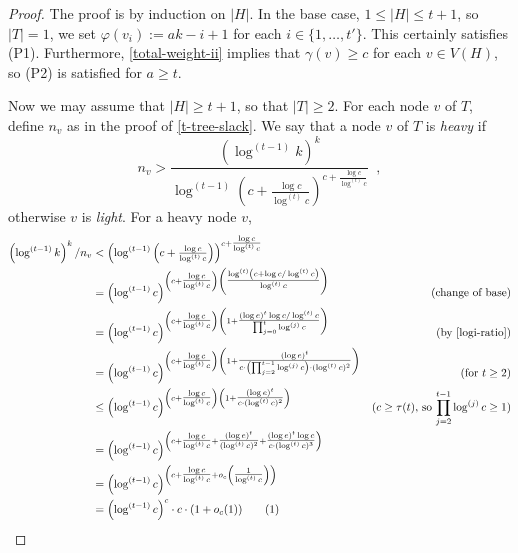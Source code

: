 \documentclass[kpfonts]{patmorin}
\newcommand\numberthis{\addtocounter{equation}{1}\tag{\theequation}}
\theoremstyle{named}
\begin{document}
\begin{proof}
    The proof is by induction on $|H|$. In the base case, $1\le|H|\le t+1$, so $|T|=1$, we set $\varphi(v_i):=ak-i+1$ for each $i\in\{1,\ldots,t'\}$.  This certainly satisfies (P1).  Furthermore, \cref{total-weight-ii} implies that $\gamma(v)\ge c$ for each $v\in V(H)$, so (P2) is satisfied for $a\ge t$.

    Now we may assume that $|H|\ge t+1$, so that $|T|\ge 2$.  For each node $v$ of $T$, define $n_v$ as in the proof of \cref{t-tree-slack}.   We say that a node $v$ of $T$ is \emph{heavy} if
    \[
        n_v> \frac{\left(\log^{(t-1)} k\right)^k}{\log^{(t-1)}\left(c+\tfrac{\log c}{\log^{(t)} c}\right)^{c+\tfrac{\log c}{\log^{(t)} c}}} \enspace ,
    \]
    otherwise $v$ is \emph{light}.  For a heavy node $v$,
    \begin{align*}
        \left(\log^{(t-1)} k\right)^k/n_v
        & < \left(\log^{(t-1)}\left(c+\tfrac{\log c}{\log^{(t)} c}\right)\right)^{c+\tfrac{\log c}{\log^{(t)} c}} \\
        & = \left(\log^{(t-1)}c\right)^{\left(c+\tfrac{\log c}{\log^{(t)} c}\right)
        \left(\tfrac{\log^{(t)}\left(c+\log c/\log^{(t)} c\right)}{\log^{(t)} c}\right)} &\text{(change of base)} \\
        & = \left(\log^{(t-1)}c\right)^{\left(c+\tfrac{\log c}{\log^{(t)} c}\right)
        \left(
        1 + \tfrac{(\log e)^t\log c/\log^{(t)} c}{\prod_{j=0}^{t}\log^{(j)}c}
        \right)} & \text{(by \cref{logi-ratio})} \\
        & = \left(\log^{(t-1)}c\right)^{\left(c+\tfrac{\log c}{\log^{(t)} c}\right)
        \left(
        1 + \tfrac{(\log e)^t}{c\cdot\left(\prod_{j=2}^{t-1}\log^{(j)}c\right)\cdot(\log^{(t)} c)^2}
        \right)} & \text{(for $t\ge 2$)} \\
        & \le \left(\log^{(t-1)}c\right)^{\left(c+\tfrac{\log c}{\log^{(t)} c}\right)
        \left(
        1 + \tfrac{(\log e)^t}{c\cdot(\log^{(t)} c)^2}
        \right)} & \text{($c\ge \tau(t)$, so $\prod_{j=2}^{t-1}\log^{(j)}c\ge 1$)} \\
        & = \left(\log^{(t-1)}c\right)^{\left(c+\tfrac{\log c}{\log^{(t)} c}+
        \tfrac{(\log e)^t}{(\log^{(t)} c)^2} + \tfrac{(\log e)^t\log c}{c\cdot(\log^{(t)} c)^3}
        \right)}  \\
        & = \left(\log^{(t-1)}c\right)^{\left(c+\tfrac{\log c}{\log^{(t)} c}
          + o_c\left(\tfrac{1}{\log^{(t)} c}\right)
        \right)}  \\
        & = \left(\log^{(t-1)}c\right)^c \cdot c\cdot (1+o_c(1))  \numberthis \label{heavy-size}
    \end{align*}


\end{proof}
\end{document}
